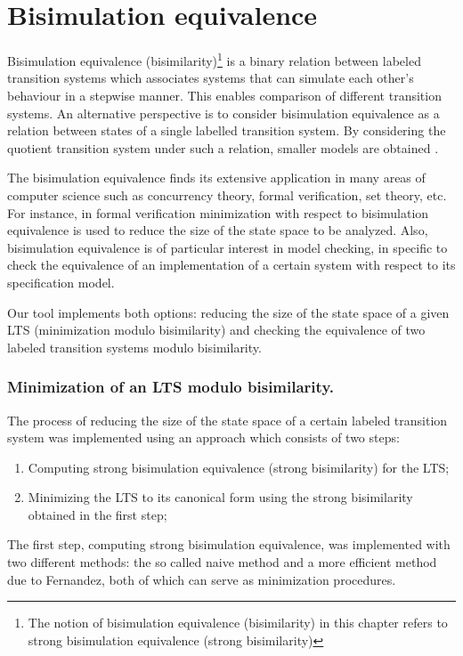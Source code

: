 \section{Bisimulation equivalence}
Bisimulation equivalence (bisimilarity)\footnote{The notion of bisimulation equivalence (bisimilarity) in this chapter 
refers to strong bisimulation equivalence (strong bisimilarity)} is a binary relation between labeled transition systems which associates systems that can simulate each other's behaviour in a stepwise manner. This enables comparison of different transition systems. An alternative perspective is to consider bisimulation equivalence as a relation between states of a single labelled transition system. By considering the quotient transition system under such a relation, smaller models are obtained \cite{ModelChecking}.

The bisimulation equivalence finds its extensive application in many areas of computer science such as concurrency theory, formal verification, set theory, etc. For instance, in formal verification minimization with respect to bisimulation equivalence is used to reduce the size of the state space to be analyzed. Also, bisimulation equivalence is of particular interest in model checking, in specific to check the equivalence of an implementation of a certain system with respect to its specification model.

Our tool implements both options: reducing the size of the state space of a given LTS (minimization modulo bisimilarity) and checking the equivalence of two labeled transition systems modulo bisimilarity.

\subsubsection{Minimization of an LTS modulo bisimilarity.}
The process of reducing the size of the state space of a certain labeled transition system was implemented using an approach which consists of two steps:
\begin{enumerate}
\item Computing strong bisimulation equivalence (strong bisimilarity) for the LTS;
\item Minimizing the LTS to its canonical form using the strong bisimilarity obtained in the first step;
\end{enumerate}

The first step, computing strong bisimulation equivalence, was implemented with two different methods: the so called
naive method and a more efficient method due to Fernandez, both of which can serve as minimization procedures.

